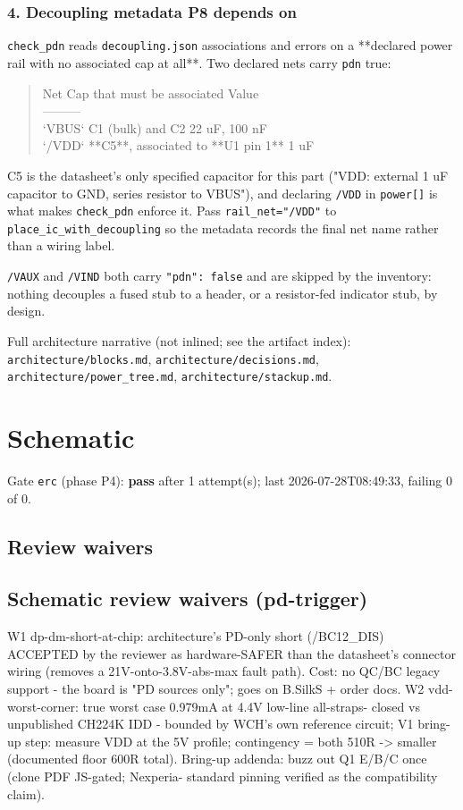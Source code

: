 \documentclass[11pt,a4paper]{article}
\begin{document}
\subsubsection*{4. Decoupling metadata P8 depends on}
\texttt{check\_pdn} reads \texttt{decoupling.json} associations and errors on a {*}{*}declared power rail with no associated cap at all{*}{*}. Two declared nets carry \texttt{pdn} true:

\begin{quote}\small\ttfamily\raggedright
\textbar{} Net \textbar{} Cap that must be associated \textbar{} Value \textbar{}\\
\textbar{}---\textbar{}---\textbar{}---\textbar{}\\
\textbar{} `VBUS` \textbar{} C1 (bulk) and C2 \textbar{} 22 uF, 100 nF \textbar{}\\
\textbar{} `/VDD` \textbar{} {*}{*}C5{*}{*}, associated to {*}{*}U1 pin 1{*}{*} \textbar{} 1 uF \textbar{}
\end{quote}
C5 is the datasheet's only specified capacitor for this part ("VDD: external 1 uF capacitor to GND, series resistor to VBUS"), and declaring \texttt{/VDD} in \texttt{power{[}{]}} is what makes \texttt{check\_pdn} enforce it. Pass \texttt{rail\_net="/VDD"} to \texttt{place\_ic\_with\_decoupling} so the metadata records the final net name rather than a wiring label.

\texttt{/VAUX} and \texttt{/VIND} both carry \texttt{"pdn": false} and are skipped by the inventory: nothing decouples a fused stub to a header, or a resistor-fed indicator stub, by design.

Full architecture narrative (not inlined; see the artifact index): \texttt{architecture/blocks.md}, \texttt{architecture/decisions.md}, \texttt{architecture/power\_tree.md}, \texttt{architecture/stackup.md}.
\section{Schematic}
Gate \texttt{erc} (phase P4): \textbf{pass} after 1 attempt(s); last 2026-07-28T08:49:33, failing 0 of 0.
\subsection*{Review waivers}
\subsection*{Schematic review waivers (pd-trigger)}
W1 dp-dm-short-at-chip: architecture's PD-only short (/BC12\_DIS) ACCEPTED by the reviewer as hardware-SAFER than the datasheet's connector wiring (removes a 21V-onto-3.8V-abs-max fault path). Cost: no QC/BC legacy support - the board is "PD sources only"; goes on B.SilkS + order docs. W2 vdd-worst-corner: true worst case 0.979mA at 4.4V low-line all-straps- closed vs unpublished CH224K IDD - bounded by WCH's own reference circuit; V1 bring-up step: measure VDD at the 5V profile; contingency = both 510R -\textgreater{} smaller (documented floor 600R total). Bring-up addenda: buzz out Q1 E/B/C once (clone PDF JS-gated; Nexperia- standard pinning verified as the compatibility claim).
\end{document}
